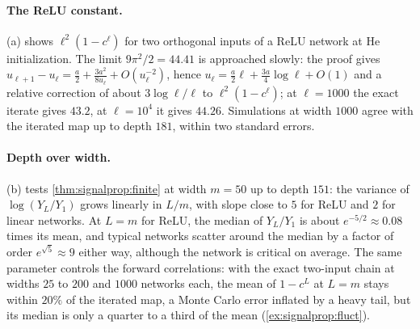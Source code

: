 \begin{refsection}
\paragraph{The ReLU constant.} (a) shows $\ell^2(1-c^\ell)$ for two orthogonal inputs of a ReLU network at He initialization. The limit $9\pi^2/2=44.41$ is approached slowly: the proof gives $u_{\ell+1}-u_\ell=\frac a2+\frac{3a^2}{8u_\ell}+O(u_\ell^{-2})$, hence $u_\ell=\frac a2\ell+\frac{3a}4\log\ell+O(1)$ and a relative correction of about $3\log\ell/\ell$ to $\ell^2(1-c^\ell)$; at $\ell=1000$ the exact iterate gives $43.2$, at $\ell=10^4$ it gives $44.26$. Simulations at width $1000$ agree with the iterated map up to depth $181$, within two standard errors.

\paragraph{Depth over width.} (b) tests \cref{thm:signalprop:finite} at width $m=50$ up to depth $151$: the variance of $\log(Y_L/Y_1)$ grows linearly in $L/m$, with slope close to $5$ for ReLU and $2$ for linear networks. At $L=m$ for ReLU, the median of $Y_L/Y_1$ is about $e^{-5/2}\approx0.08$ times its mean, and typical networks scatter around the median by a factor of order $e^{\sqrt5}\approx9$ either way, although the network is critical on average. The same parameter controls the forward correlations: with the exact two-input chain at widths $25$ to $200$ and $1000$ networks each, the mean of $1-c^L$ at $L=m$ stays within $20\%$ of the iterated map, a Monte Carlo error inflated by a heavy tail, but its median is only a quarter to a third of the mean (\cref{ex:signalprop:fluct}).


\end{refsection}
